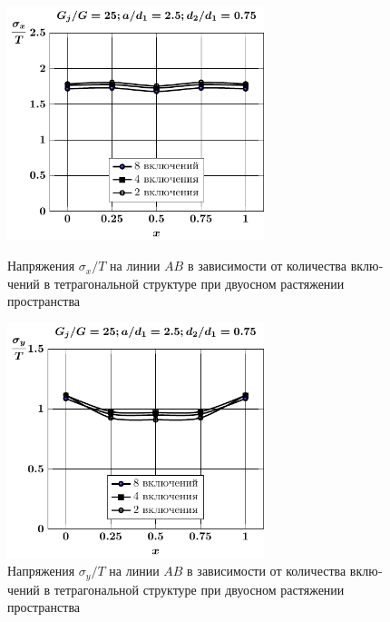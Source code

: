 \begin{russian}
%

\begin{figure}[h!]
\centering\footnotesize
\parbox[b]{7.5cm}{\centering\includegraphics[width=7.5cm]{inc8-4-2-a25-d75-g25-sig_x-spheroids-tension2.pdf}
\caption{Напряжения $\sigma_x/T$ на линии $AB$ в зависимости от количества включений в тетрагональной структуре при двуосном растяжении пространства
\label{f:9:23}}}\hfil\hfil
\parbox[b]{7.5cm}{\centering\includegraphics[width=7.5cm]{inc8-4-2-a25-d75-g25-sig_y-spheroids-tension2.pdf}
\caption{Напряжения $\sigma_y/T$ на линии $AB$ в зависимости от количества включений в тетрагональной структуре при двуосном растяжении пространства
\label{f:9:24}}}
\end{figure}


\end{russian}
